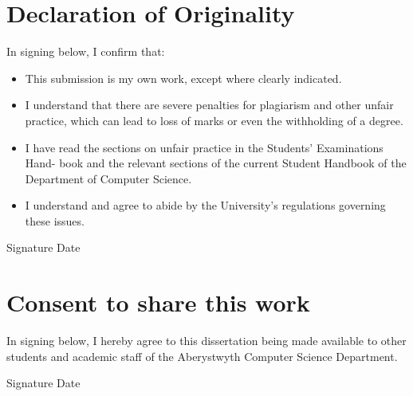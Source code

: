\section*{Declaration of Originality}

In signing below, I confirm that:

\begin{itemize}
	\item This submission is my own work, except where clearly indicated.
	\item I understand that there are severe penalties for plagiarism and other unfair practice, which can lead to loss of marks or even the withholding of a degree.
	\item I have read the sections on unfair practice in the Students' Examinations Hand- book and the relevant sections of the current Student Handbook of the Department of Computer Science.
	\item I understand and agree to abide by the University's regulations governing these issues.
\end{itemize}

\vspace{1cm}

{ \Large
Signature \hrulefill
\hspace{1cm}
Date \hrulefill
}

\vspace{2cm}

\section*{Consent to share this work}

In signing below, I hereby agree to this dissertation being made available to other students and academic staff of the Aberystwyth Computer Science Department.

\vspace{2cm}

{ \Large
Signature \hrulefill
\hspace{1cm}
Date \hrulefill
}
